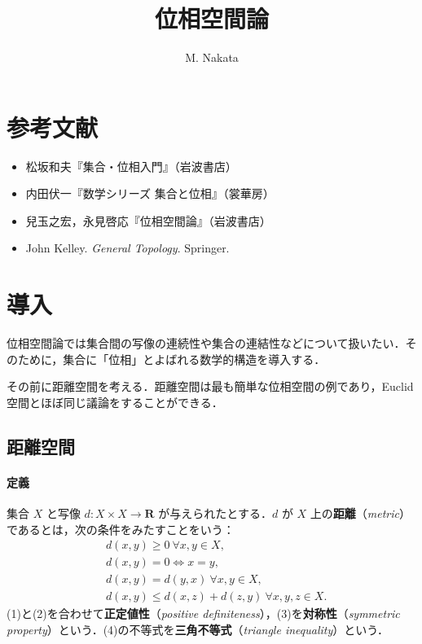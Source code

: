 \documentclass[b5paper,pandoc]{bxjsarticle}
\title{位相空間論}
\author{M. Nakata}
\date{}
\providecommand{\tightlist}{%
  \setlength{\itemsep}{0pt}\setlength{\parskip}{0pt}}
\let\oldparagraph\paragraph
\renewcommand{\paragraph}[1]{\oldparagraph{#1}\mbox{}}
\begin{document}
\maketitle

{
\setcounter{tocdepth}{3}
\tableofcontents
}
\hypertarget{ux53c2ux8003ux6587ux732e}{%
\section{参考文献}\label{ux53c2ux8003ux6587ux732e}}

\begin{itemize}
\tightlist
\item
  松坂和夫『集合・位相入門』（岩波書店）
\item
  内田伏一『数学シリーズ 集合と位相』（裳華房）
\item
  兒玉之宏，永見啓応『位相空間論』（岩波書店）
\item
  John Kelley. \emph{General Topology}. Springer.
\end{itemize}

\hypertarget{topology-introduction}{%
\section{導入}\label{topology-introduction}}

位相空間論では集合間の写像の連続性や集合の連結性などについて扱いたい．そのために，集合に「位相」とよばれる数学的構造を導入する．

その前に距離空間を考える．距離空間は最も簡単な位相空間の例であり，Euclid空間とほぼ同じ議論をすることができる．

\hypertarget{metric-space}{%
\subsection{距離空間}\label{metric-space}}

\hypertarget{metric-space-def}{%
\paragraph{定義}\label{metric-space-def}}

集合 \(X\) と写像 \(d \colon X \times X \to \boldsymbol{R}\)
が与えられたとする．\(d\) が \(X\)
上の\textbf{距離}（\emph{metric}）であるとは，次の条件をみたすことをいう：
\begin{align}
& d(x, y) \ge 0 \ \forall x, y \in X,\\
& d(x, y) = 0 \Longleftrightarrow x = y,\\
& d(x, y) = d(y, x) \ \forall x, y \in X,\\
& d(x, y) \le d(x, z) + d(z, y) \ \forall x, y, z \in X.
\end{align} (1)と(2)を合わせて\textbf{正定値性}（\emph{positive
definiteness}），(3)を\textbf{対称性}（\emph{symmetric
property}）という．(4)の不等式を\textbf{三角不等式}（\emph{triangle
inequality}）という．
\end{document}
